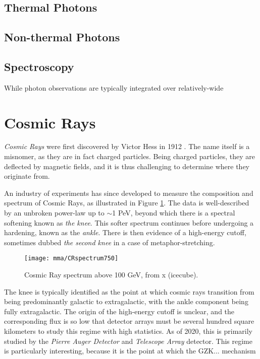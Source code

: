  \subsection{Thermal Photons}

 \subsection{Non-thermal Photons}
 
 \subsection{Spectroscopy}
 
While photon observations are typically integrated over relatively-wide 

\section{Cosmic Rays}

\emph{Cosmic Rays} were first discovered by Victor Hess in 1912 . The name itself is a misnomer, as they are in fact charged particles. Being charged particles, they are deflected by magnetic fields, and it is thus challenging to determine where they originate from.

An industry of experiments has since developed to measure the composition and spectrum of Cosmic Rays, as illustrated in Figure \ref{fig:CR_spectrum}. The data is well-described by an unbroken power-law up to $\sim$1 PeV, beyond which there is a spectral softening known as \emph{the knee}. This softer spectrum continues before undergoing a hardening, known as the \emph{ankle}. There is then evidence of a high-energy cutoff, sometimes dubbed \emph{the second knee} in a case of metaphor-stretching.

\begin{figure}[!ht]
	\centering \texttt{[image: mma/CRspectrum750]}
	\caption{Cosmic Ray spectrum above 100 GeV, from x (icecube).}
	\label{fig:CR_spectrum}
\end{figure}

The knee is typically identified as the point at which cosmic rays transition from being predominantly galactic to extragalactic, with the ankle component being fully extragalactic. The origin of the high-energy cutoff is unclear, and the corresponding flux is so low that detector arrays must be several hundred square kilometers to study this regime with high statistics. As of 2020, this is primarily studied by the \emph{Pierre Auger Detector} and \emph {Telescope Array} detector. This regime is particularly interesting, because it is the point at which the GZK... mechanism 

